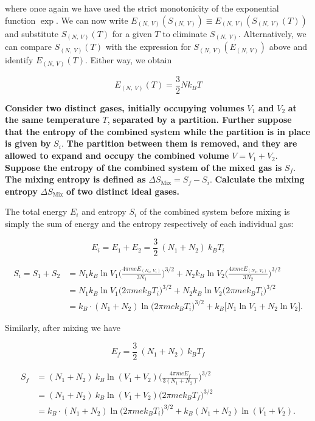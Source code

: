 \documentclass[11pt]{article}
\begin{document}
where once again we have used the strict monotonicity of the exponential function \(\exp\). We can now write \(E_{(N,~V)} (S_{(N,~V)}) \equiv E_{(N,~V)} (S_{(N,~V)}(T))\) and substitute \(S_{(N,~V)}(T)\) for a given \(T\) to eliminate \(S_{(N,~V)}\). Alternatively, we can compare \(S_{(N,~V)}(T)\) with the expression for \(S_{(N,~V)}(E_{(N,~V)})\) above and identify \(E_{(N,~V)}(T)\). Either way, we obtain

\[
\boxed{
E_{(N,~V)} (T) = \frac{3}{2} N k_{B} T
}
\]
\label{sec:org6a37679}

\textbf{Consider two distinct gases, initially occupying volumes} \(V_{1}\) \textbf{and} \(V_{2}\) \textbf{at the same temperature} \(T\), \textbf{separated by a partition. Further suppose that the entropy of the combined system while the partition is in place is given by} \(S_{i}\). \textbf{The partition between them is removed, and they are allowed to expand and occupy the combined volume} \(V=V_{1}+V_{2}\). \textbf{Suppose the entropy of the combined system of the mixed gas is} \(S_{f}\). \textbf{The mixing entropy is defined as} \(\Delta S_{\text{Mix}} = S_{f} - S_{i}\). \textbf{Calculate the mixing entropy} \(\Delta S_{\text{Mix}}\) \textbf{of two distinct ideal gases.}

The total energy \(E_{i}\) and entropy \(S_{i}\) of the combined system before mixing is simply the sum of energy and the entropy respectively of each individual gas:

\[
E_{i} = E_{1} + E_{2} = \frac{3}{2} ~ (N_{1} + N_{2})~ k_{B} T_{i} 
\]

\begin{align*}
S_{i}=S_{1}+S_{2} &= N_{1} k_{B} \ln V_{1} \bigg(\frac{4 \pi m e E_{(N_{1},~V_{1})}}{3 N_{1}}\bigg)^{3/2} + N_{2} k_{B} \ln V_{2} \bigg(\frac{4 \pi m e E_{(N_{2},~V_{2})}}{3 N_{2}}\bigg)^{3/2} \\
&= N_{1} k_{B} \ln V_{1} \big(2 \pi m e k_{B} T_{i}\big)^{3/2} + N_{2} k_{B} \ln V_{2} \big(2 \pi m e k_{B} T_{i}\big)^{3/2} \\
&= k_{B} \cdot (N_{1} + N_{2}) \ln \big(2 \pi m e k_{B} T_{i}\big)^{3/2} + k_{B} \big[N_{1} \ln V_{1} + N_{2} \ln V_{2}\big].
\end{align*}

Similarly, after mixing we have

\[
E_{f} = \frac{3}{2} ~ (N_{1} + N_{2})~ k_{B} T_{f}
\]

\begin{align*}
S_{f} &= (N_{1} + N_{2}) ~ k_{B} \ln (V_{1} + V_{2}) \bigg(\frac{4 \pi m e E_{f}}{3 (N_{1} + N_{2})}\bigg)^{3/2} \\
&= (N_{1} + N_{2}) ~ k_{B} \ln (V_{1} + V_{2}) \big(2 \pi m e k_{B} T_{f}\big)^{3/2} \\
&= k_{B} \cdot (N_{1} + N_{2}) \ln \big(2 \pi m e k_{B} T_{i}\big)^{3/2} + k_{B} (N_{1} + N_{2}) \ln (V_{1} + V_{2}).
\end{align*}
\end{document}
